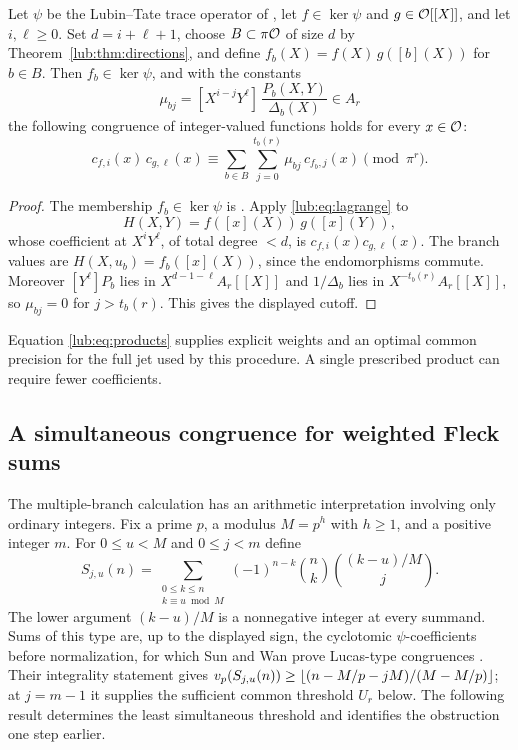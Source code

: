 \begin{proposition}\label{lub:prop:products}
Let $\psi$ be the Lubin--Tate trace operator of \cite{BergerSprang2025Integer}, let
$f\in\ker\psi$ and $g\in\mathcal{O}[[X]]$, and let $i,\ell\ge0$. Set $d=i+\ell+1$, choose
$B\subset\pi\mathcal{O}$ of size $d$ by Theorem~\ref{lub:thm:directions}, and define
$f_b(X)=f(X)\,g([b](X))$ for $b\in B$. Then $f_b\in\ker\psi$, and with the constants
\[
 \mu_{bj}=[X^{i-j}Y^{\ell}]\,\frac{P_b(X,Y)}{\Delta_b(X)}\in A_r
\]
the following congruence of integer-valued functions holds for every $x\in\mathcal{O}$:
\begin{equation}\label{lub:eq:products}
 c_{f,i}(x)\,c_{g,\ell}(x)\equiv\sum_{b\in B}\sum_{j=0}^{t_b(r)}\mu_{bj}\,c_{f_b,j}(x)\pmod{\pi^r}.
\end{equation}
\end{proposition}
\begin{proof}
The membership $f_b\in\ker\psi$ is \cite[Lemma~4.5]{BergerSprang2025Integer}. Apply
\eqref{lub:eq:lagrange} to
\[
 H(X,Y)=f([x](X))\,g([x](Y)),
\]
whose coefficient at $X^iY^{\ell}$, of total degree $<d$, is $c_{f,i}(x)c_{g,\ell}(x)$.
The branch values are $H(X,u_b)=f_b([x](X))$, since the endomorphisms commute. Moreover
$[Y^{\ell}]P_b$ lies in $X^{d-1-\ell}A_r[[X]]$ and $1/\Delta_b$ lies in
$X^{-t_b(r)}A_r[[X]]$, so $\mu_{bj}=0$ for $j>t_b(r)$. This gives the displayed cutoff.
\end{proof}

Equation \eqref{lub:eq:products} supplies explicit weights and an optimal common precision
for the full jet used by this procedure. A single prescribed product can require fewer
coefficients.

\subsection{A simultaneous congruence for weighted Fleck sums}\label{lub:ssec:fleck}
\begingroup\raggedright{}\endgroup

The multiple-branch calculation has an arithmetic interpretation involving only ordinary
integers. Fix a prime $p$, a modulus $M=p^h$ with $h\ge1$, and a positive integer $m$. For
$0\le u<M$ and $0\le j<m$ define
\[
 S_{j,u}(n)=\sum_{\substack{0\le k\le n\\ k\equiv u\bmod M}}
 (-1)^{n-k}\binom nk\binom{(k-u)/M}{j}.
\]
The lower argument $(k-u)/M$ is a nonnegative integer at every summand. Sums of this type
are, up to the displayed sign, the cyclotomic $\psi$-coefficients before normalization, for
which Sun and Wan prove Lucas-type congruences \cite{SunWan2005Lucas}. Their integrality
statement gives
$v_p(S_{j,u}(n))\ge\lfloor(n-M/p-jM)/(M-M/p)\rfloor$; at $j=m-1$ it supplies the sufficient
common threshold $U_r$ below. The following result determines the least simultaneous
threshold and identifies the obstruction one step earlier.


